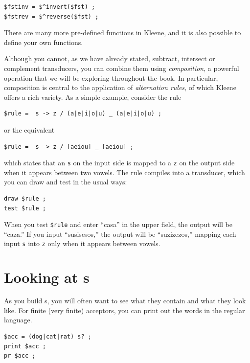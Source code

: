 \begin{Verbatim}
$fstinv = $^invert($fst) ;
$fstrev = $^reverse($fst) ;
\end{Verbatim}

\noindent
There are many more pre-defined functions in Kleene, and it is also possible to define your own functions.

Although you cannot, as we have already stated, subtract, intersect or complement
transducers, you can combine them using \emph{composition}, a powerful operation that we
will be exploring throughout the book.
In particular, composition is central to the application of \emph{alternation rules}, of
which Kleene offers a rich variety.  As a simple example, consider the rule

\begin{Verbatim}
$rule =  s -> z / (a|e|i|o|u) _ (a|e|i|o|u) ;
\end{Verbatim}

\noindent
or the equivalent

\begin{Verbatim}
$rule =  s -> z / [aeiou] _ [aeiou] ;
\end{Verbatim}

\noindent
which states that an \texttt{s} on the input side is mapped to a \texttt{z} on the output
side when it appears between two vowels.  The rule compiles into a transducer, which you can
draw and test in the usual ways:

\begin{Verbatim}
draw $rule ;
test $rule ;
\end{Verbatim}

\noindent
When you test \verb!$rule! and enter ``casa'' in the upper field, the output will be ``caza.''  If you input
``susisesos,'' the output will be ``suzizezos,'' mapping each input \texttt{s} into \texttt{z} only when it
appears between vowels.


\section{Looking at \fsm{}s}

As you build \fsm{}s, you will often want to see what they contain and what they look like. 
For finite (very finite) acceptors, you can print out the words in the regular language.


\begin{Verbatim}
$acc = (dog|cat|rat) s? ;
print $acc ;
pr $acc ;
\end{Verbatim}

